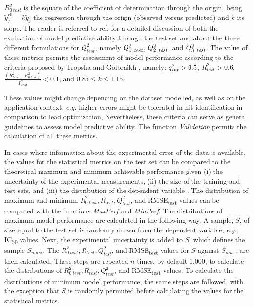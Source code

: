 \documentclass[twoside,a4wide,10pt]{article}
\begin{document}
$R_{0\ test}^2$ is the square of the coefficient of determination through the origin, being $\widetilde{y}_{j}^{ r0} = k \widetilde{y}_j$ the regression through the origin (observed versus predicted) and $k$ its slope.
The reader is referred to ref. \citep{consonni} for a detailed discussion of both the evaluation of model predictive ability through the test set and about the three different formulations for $Q^{2}_{test}$, namely $Q_{1\ {\it test}}^{2}$, $Q_{2\ {\it test}}^{2}$, and $Q_{3\ {\it test}}^{2}$. 
The value of these metrics permits the assessment of model performance according to the criteria proposed by Tropsha and Golbraikh \citep{beware,earnest},
namely:
$q_{{\it int}}^{2} > 0.5$,
$R_{test}^2 > 0.6$,
$ \frac {(R_{test}^2 - R_{0\ test}^2)} {R_{test}^2} < 0.1$, and
$0.85 \leq k \leq 1.15$.

These values might change depending on the dataset modelled, as
well as on the application context, {\it e.g.} higher errors might be tolerated 
in hit identification in comparison to lead optimization,
Nevertheless, these criteria can serve as general guidelines to assess model predictive ability.
The function {\it Validation} permits the calculation of all these metrics.

In cases where information about the experimental error of the data is available,
the values for the statistical metrics on the test set
can be compared to the theoretical maximum and minimum achievable performance given 
(i) the uncertainty of the experimental measurements,
(ii) the size of the training and test sets,
and (iii) the distribution of the dependent variable \citep{cortesGP}.
The distribution of maximum and minimum $R_{0\ test}^2, R_{test}, Q^{2}_{test}$, and RMSE\textsubscript{test} 
values can be computed with the functions {\it MaxPerf} and {\it MinPerf}.
The distributions of maximum model performance are calculated in the following way.
A sample, $S$, of size equal to the test set is randomly drawn from the dependent variable, {\it e.g.} IC\textsubscript{50} values.
Next, the experimental uncertainty is added to $S$, 
which defines the sample $S_{noise}$.
The $R_{0\ test}^2, R_{test}, Q^{2}_{test}$, and RMSE\textsubscript{test} values
for $S$ against $S_{noise}$ are then calculated.
These steps are repeated $n$ times, by default 1,000, to calculate
the distributions of $R_{0\ test}^2, R_{test}, Q^{2}_{test}$, and RMSE\textsubscript{test} values.
To calculate the distributions of minimum model performance,
the same steps are followed, with the exception that $S$ is randomly
permuted before calculating the values for the statistical metrics.
\end{document}
